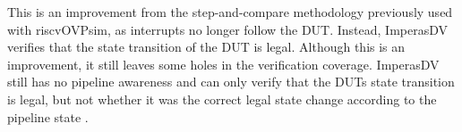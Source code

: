 This is an improvement from the step-and-compare methodology previously used with riscvOVPsim, as interrupts no longer follow the DUT. Instead, ImperasDV verifies that the state transition of the DUT is legal. Although this is an improvement, it still leaves some holes in the verification coverage.
ImperasDV still has no pipeline awareness and can only verify that the DUTs state transition is legal, but not whether it was the correct legal state change according to the pipeline state \cite{taylorAdvancedRISCVVerification2023}.



%
%
%
%
%
%
